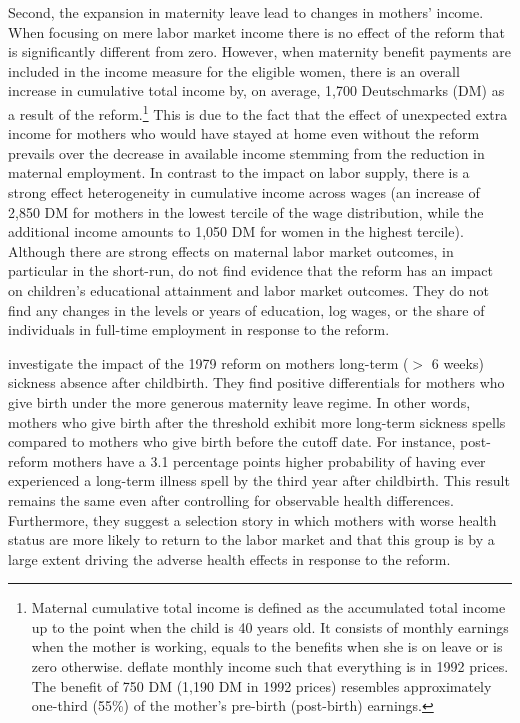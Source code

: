 \documentclass[11pt, a4paper,draft]{article} %
\begin{document}
Second, the expansion in maternity leave lead to changes in mothers' income. When focusing on mere labor market income there is no effect of the reform that is significantly different from zero. However, when maternity benefit payments are included in the income measure for the eligible women, there is an overall increase in cumulative total income by, on average, 1,700 Deutschmarks (DM) as a result of the reform.\footnote{Maternal cumulative total  income is defined as the accumulated total income up to the point when the child is 40 years old. It consists of monthly earnings when the mother is working, equals to the benefits when she is on leave or is zero otherwise.\newline \cite{Dustmann2012} deflate monthly income such that everything is in 1992 prices. The benefit of 750 DM (1,190 DM in 1992 prices) resembles approximately one-third (55\%) of the mother's pre-birth (post-birth) earnings.} This is due to the fact that the effect of unexpected extra income for mothers who would have stayed at home even without the reform prevails over the decrease in available income stemming from the reduction in maternal employment. In contrast to the impact on labor supply, there is a strong effect heterogeneity in cumulative income across wages (an increase of 2,850 DM for mothers in the lowest tercile of the wage distribution, while the additional income amounts to 1,050 DM for women in the highest tercile). \newline
Although there are strong effects on maternal labor market outcomes, in particular in the short-run, \cite{Dustmann2012} do not find evidence that the reform has an impact on children's educational attainment and labor market outcomes. They do not find any changes in the levels or years of education, log wages, or the share of individuals in full-time employment in response to the reform. 


\cite{guertzgen2018} investigate the impact of the 1979 reform on mothers long-term ($>$ 6 weeks) sickness absence after childbirth. They find positive differentials for mothers who give birth under the more generous maternity leave regime. In other words, mothers who give birth after the threshold exhibit more long-term sickness spells compared to mothers who give birth before the cutoff date. For instance, post-reform mothers have a 3.1 percentage points higher probability of having ever experienced a long-term illness spell by the third year after childbirth. This result remains the same even after controlling for observable health differences. Furthermore, they suggest a selection story in which mothers with worse health status are more likely to return to the labor market and that this group is by a large extent driving the adverse health effects in response to the reform.\newline
\end{document}
